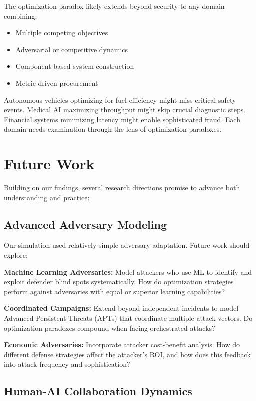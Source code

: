 \documentclass[10pt,conference]{IEEEtran}
\begin{document}
The optimization paradox likely extends beyond security to any domain combining:
\begin{itemize}
\item Multiple competing objectives
\item Adversarial or competitive dynamics
\item Component-based system construction
\item Metric-driven procurement
\end{itemize}

Autonomous vehicles optimizing for fuel efficiency might miss critical safety events. Medical AI maximizing throughput might skip crucial diagnostic steps. Financial systems minimizing latency might enable sophisticated fraud. Each domain needs examination through the lens of optimization paradoxes.

\section{Future Work}

Building on our findings, several research directions promise to advance both understanding and practice:

\subsection{Advanced Adversary Modeling}

Our simulation used relatively simple adversary adaptation. Future work should explore:

\textbf{Machine Learning Adversaries:} Model attackers who use ML to identify and exploit defender blind spots systematically. How do optimization strategies perform against adversaries with equal or superior learning capabilities?

\textbf{Coordinated Campaigns:} Extend beyond independent incidents to model Advanced Persistent Threats (APTs) that coordinate multiple attack vectors. Do optimization paradoxes compound when facing orchestrated attacks?

\textbf{Economic Adversaries:} Incorporate attacker cost-benefit analysis. How do different defense strategies affect the attacker's ROI, and how does this feedback into attack frequency and sophistication?

\subsection{Human-AI Collaboration Dynamics}
\end{document}
